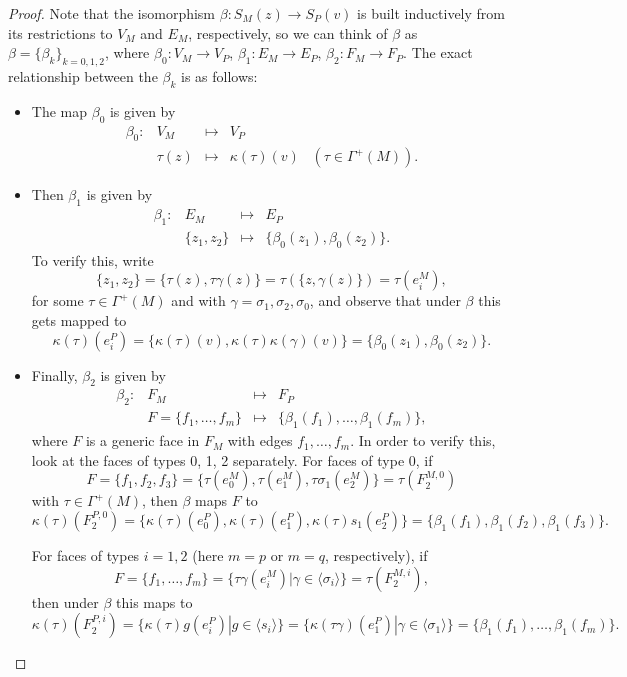 \documentclass[12pt]{article}
\theoremstyle{definition}\newtheorem{definition}{Definition}[section]
\begin{document}
\begin{proof}
Note that the isomorphism $\beta:{S}_M(z) \rightarrow {S}_P(v)$ is built  inductively from its restrictions to $V_M$ and $E_M$, respectively, so we can think of $\beta$ as $\beta = \{\beta_k\}_{k=0,1,2}$, where $\beta_0: V_M \rightarrow V_P$, $\beta_1:E_M\rightarrow E_P$, $\beta_2: F_M\rightarrow F_P$. The exact relationship between the $\beta_k$ is as follows: 

\noindent
\begin{itemize}
\item[(i)] The map $\beta_0$ is given by 
    $$\begin{array}{rlcl}
    \beta_0:& V_M& \mapsto& V_P\\
            &\tau(z)& \mapsto& \kappa(\tau)(v) \;\;\; (\tau\in \Gamma^+(M)).
    \end{array}$$
    
    \item[(ii)] Then $\beta_1$ is given by 
    $$\begin{array}{rlcl}
    \beta_1: & E_M         &\mapsto& E_P\\
             & \{z_1,z_2\} &\mapsto& \{\beta_{0}(z_1),\beta_0(z_2)\}.
    \end{array}$$
    To verify this, write  
    $$\{z_1,z_2\} = \{\tau(z),\tau\gamma(z)\} = \tau(\{z,\gamma(z)\}) = \tau(e_i^M),$$
    for some $\tau\in\Gamma^{+}(M)$ and with $\gamma = \sigma_1, \sigma_2, \sigma_0$, and observe that under $\beta$ this gets mapped to 
    $$\kappa(\tau)(e_i^P) = \{\kappa(\tau)(v),\kappa(\tau)\kappa(\gamma)(v)\} = \{\beta_0(z_1),\beta_0(z_2)\}.$$ 
    
    \item[(iii)] Finally, $\beta_2$ is given by 
    $$\begin{array}{rlcl}
    \beta_2:& F_M         & \mapsto& F_P\\
          &F=\{f_1,\ldots,f_m\}& \mapsto& \{\beta_1(f_1),\ldots,\beta_1(f_m)\},
    \end{array}$$
    where $F$ is a generic face in $F_M$ with edges $f_1,\dots,f_m$. In order to verify this, look at the faces of types 0, 1, 2 separately. For faces of type $0$, if  
    $$F=\{f_1,f_2,f_3\} = \{\tau(e_0^M), \tau(e_1^M), \tau\sigma_1(e_2^M)\} = \tau(F_2^{M,0})$$ 
    with $\tau\in \Gamma^+(M)$, then $\beta$ maps $F$ to $$\kappa(\tau)(F_2^{P,0}) = \{\kappa(\tau)(e_0^P), \kappa(\tau)(e_1^P), \kappa(\tau)s_1(e_2^P)\} = \{\beta_1(f_1), \beta_1(f_2), \beta_1(f_3)\}.$$ 

    For faces of types $i=1,2$ (here $m=p$ or $m=q$, respectively), if 
    $$F=\{f_1, \dots, f_m\} = \{\tau\gamma(e_i^M)|\gamma\in \langle \sigma_i\rangle \} = \tau(F_2^{M,i}),$$ then under $\beta$ this maps to 
    $$\kappa(\tau)(F_2^{P,i}) = \{\kappa(\tau)g(e_i^P)|g\in \langle s_i\rangle\}  = \{\kappa(\tau\gamma)(e_1^P)|\gamma\in \langle \sigma_1 \rangle\} = \{\beta_1(f_1),\dots, \beta_1(f_m)\}.$$    
\end{itemize}
\smallskip


\end{proof}
\end{document}
